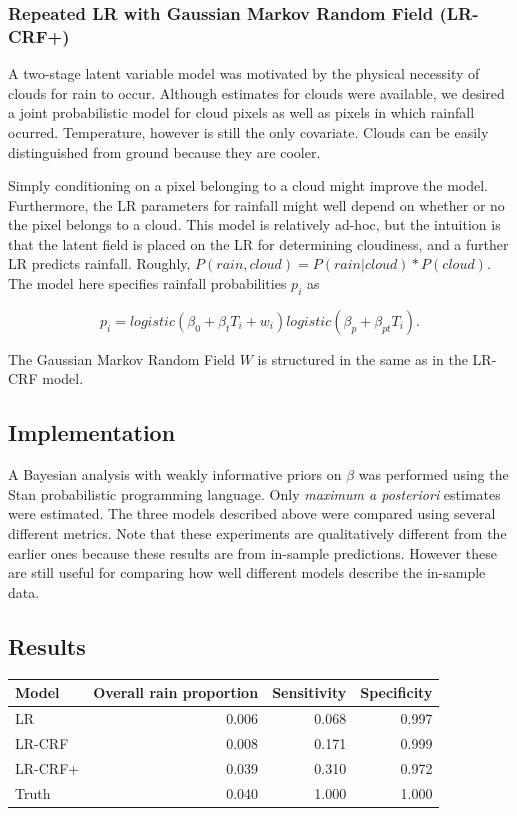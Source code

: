 \subsubsection{Repeated LR with Gaussian Markov Random Field (LR-CRF+)}
A two-stage latent variable model was motivated by the physical necessity of clouds for rain to occur. Although estimates for clouds were available, we desired a joint probabilistic model for cloud pixels as well as pixels in which rainfall ocurred. Temperature, however is still the only covariate. Clouds can be easily distinguished from ground because they are cooler.

Simply conditioning on a pixel belonging to a cloud might improve the model. Furthermore, the LR parameters for rainfall might well depend on whether or no the pixel belongs to a cloud. This model is relatively ad-hoc, but the intuition is that the latent field is placed on the LR for determining cloudiness, and a further LR predicts rainfall. Roughly, $P(rain, cloud)= P(rain| cloud)*P(cloud)$. The model here specifies rainfall probabilities $p_i$ as

$$
p_i = logistic(\beta_0 + \beta_t T_i + w_i)  logistic(\beta_p + \beta_{pt} T_i).
$$

The Gaussian Markov Random Field $W$ is structured in the same as in the LR-CRF model.

\subsection{Implementation}
A Bayesian analysis with weakly informative priors on $\beta$ was performed using the Stan probabilistic programming language. Only \emph{maximum a posteriori} estimates were estimated. The three models described above were compared using several different metrics. Note that these experiments are qualitatively different from the earlier ones because these results are from in-sample predictions. However these are still useful for comparing how well different models describe the in-sample data.

\subsection{Results}

\begin{table}[ht]
\centering
\begin{tabular}{lrrr}
  \hline
Model & Overall rain proportion & Sensitivity & Specificity \\ 
  \hline
LR & 0.006 & 0.068 & 0.997 \\ 
  LR-CRF & 0.008 & 0.171 & 0.999 \\ 
  LR-CRF+ & 0.039 & 0.310 & 0.972 \\ 
   \hline
   Truth & 0.040 & 1.000 & 1.000
\end{tabular}
\end{table}

